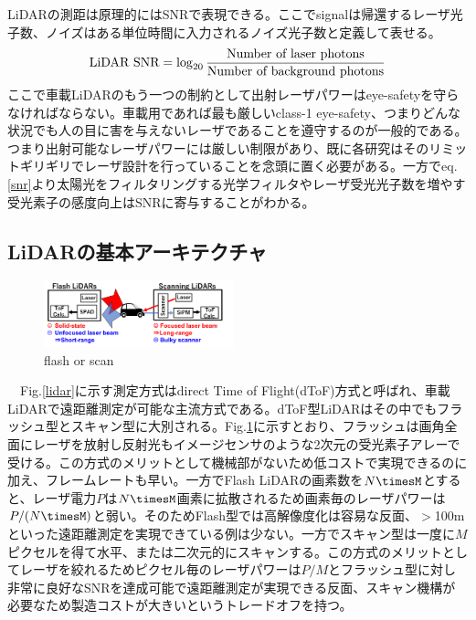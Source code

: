 \documentclass[twocolumn, 11pt, a4j]{article}
\begin{document}
LiDARの測距は原理的にはSNRで表現できる。ここでsignalは帰還するレーザ光子数、ノイズはある単位時間に入力されるノイズ光子数と定義して表せる\cite{yoshioka201820}。
\begin{eqnarray}
    \centering
    \textrm{LiDAR SNR} = \log_{20}{\frac{\textrm{Number of laser photons}}{\textrm{Number of background photons}}}
    \label{snr}
\end{eqnarray}
ここで車載LiDARのもう一つの制約として出射レーザパワーはeye-safetyを守らなければならない。車載用であれば最も厳しいclass-1 eye-safety、つまりどんな状況でも人の目に害を与えないレーザであることを遵守するのが一般的である。つまり出射可能なレーザパワーには厳しい制限があり、既に各研究はそのリミットギリギリでレーザ設計を行っていることを念頭に置く必要がある。一方でeq.\ref{snr}より太陽光をフィルタリングする光学フィルタやレーザ受光光子数を増やす受光素子の感度向上はSNRに寄与することがわかる。

\subsection{LiDARの基本アーキテクチャ}
\begin{figure}[!t]
\centering
 \includegraphics[width=0.49\textwidth]{figs/flashscan.png}
  \caption{flash or scan}
\label{flash}
\end{figure}

　Fig.\ref{lidar}に示す測定方式はdirect Time of Flight(dToF)方式と呼ばれ、車載LiDARで遠距離測定が可能な主流方式である。dToF型LiDARはその中でもフラッシュ型\cite{ximenes2018256}とスキャン型に大別される。Fig.\ref{flash}に示すとおり、フラッシュは画角全面にレーザを放射し反射光もイメージセンサのような2次元の受光素子アレーで受ける。この方式のメリットとして機械部がないため低コストで実現できるのに加え、フレームレートも早い。一方でFlash LiDARの画素数を$N\timesM$とすると、レーザ電力$P$は$N\timesM$画素に拡散されるため画素毎のレーザパワーは$P/(N\timesM)$と弱い。そのためFlash型では高解像度化は容易な反面、$>$100mといった遠距離測定を実現できている例は少ない。一方でスキャン型は一度に$M$ピクセルを得て水平、または二次元的にスキャンする。この方式のメリットとしてレーザを絞れるためピクセル毎のレーザパワーは$P/M$とフラッシュ型に対し非常に良好なSNRを達成可能で遠距離測定が実現できる反面、スキャン機構が必要なため製造コストが大きいというトレードオフを持つ。
\end{document}
